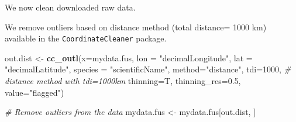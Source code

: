 \documentclass[
]{book}
\newenvironment{Shaded}{\begin{snugshade}}{\end{snugshade}}
\newcommand{\AttributeTok}[1]{\textcolor[rgb]{0.13,0.29,0.53}{#1}}
\newcommand{\CommentTok}[1]{\textcolor[rgb]{0.56,0.35,0.01}{\textit{#1}}}
\newcommand{\DecValTok}[1]{\textcolor[rgb]{0.00,0.00,0.81}{#1}}
\newcommand{\FloatTok}[1]{\textcolor[rgb]{0.00,0.00,0.81}{#1}}
\newcommand{\FunctionTok}[1]{\textcolor[rgb]{0.13,0.29,0.53}{\textbf{#1}}}
\newcommand{\NormalTok}[1]{#1}
\newcommand{\OtherTok}[1]{\textcolor[rgb]{0.56,0.35,0.01}{#1}}
\newcommand{\SpecialCharTok}[1]{\textcolor[rgb]{0.81,0.36,0.00}{\textbf{#1}}}
\newcommand{\StringTok}[1]{\textcolor[rgb]{0.31,0.60,0.02}{#1}}
\begin{document}
We now clean downloaded raw data.

\begin{Shaded}
\end{Shaded}

We remove outliers based on distance method (total distance= 1000 km) available in the \texttt{CoordinateCleaner} package.

\begin{Shaded}
\begin{Highlighting}[]
\NormalTok{out.dist }\OtherTok{\textless{}{-}} \FunctionTok{cc\_outl}\NormalTok{(}\AttributeTok{x=}\NormalTok{mydata.fus,}
                \AttributeTok{lon =} \StringTok{"decimalLongitude"}\NormalTok{, }\AttributeTok{lat =} \StringTok{"decimalLatitude"}\NormalTok{,}
                \AttributeTok{species =} \StringTok{"scientificName"}\NormalTok{,}
                \AttributeTok{method=}\StringTok{"distance"}\NormalTok{, }\AttributeTok{tdi=}\DecValTok{1000}\NormalTok{, }\CommentTok{\# distance method with tdi=1000km}
                \AttributeTok{thinning=}\NormalTok{T, }\AttributeTok{thinning\_res=}\FloatTok{0.5}\NormalTok{,}
                \AttributeTok{value=}\StringTok{"flagged"}\NormalTok{) }

\CommentTok{\# Remove outliers from the data}
\NormalTok{mydata.fus }\OtherTok{\textless{}{-}}\NormalTok{ mydata.fus[out.dist, ]}
\end{Highlighting}
\end{Shaded}
\end{document}

